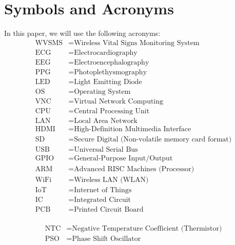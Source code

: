 
\chapter*{Symbols and  Acronyms}
  

\vspace{1cm}

In this paper, we  will  use the  following  acronyms:
\begin{align*}
\mbox{WVSMS} & =  \mbox{Wireless Vital Signs Monitoring System}    \\
\mbox{ECG} & =  \mbox{Electrocardiography}     \\
\mbox{EEG} & =  \mbox{Electroencephalography}     \\
\mbox{PPG} & =  \mbox{Photoplethysmography}    \\
\mbox{LED} & =  \mbox{Light Emitting Diode} \\
\mbox{OS} & =  \mbox{Operating System}	\\
\mbox{VNC} & =  \mbox{Virtual Network Computing}  \\
\mbox{CPU} & =  \mbox{Central Processing Unit}  \\
\mbox{LAN} & =  \mbox{Local Area Network}  \\
\mbox{HDMI} & =  \mbox{High-Definition Multimedia Interface}  \\
\mbox{SD} & =  \mbox{Secure Digital (Non-volatile memory card format)}  \\
\mbox{USB} & =  \mbox{Universal Serial Bus}  \\
\mbox{GPIO} & =  \mbox{General-Purpose Input/Output}  \\
\mbox{ARM} & =  \mbox{Advanced RISC Machines (Processor)}  \\
\mbox{WiFi} & =  \mbox{Wireless LAN (WLAN)}  \\
\mbox{IoT} & =  \mbox{Internet of Things}  \\
\mbox{IC} & =  \mbox{Integrated Circuit} \\
\mbox{PCB} & =  \mbox{Printed Circuit Board}  \\
\end{align*}


\begin{align*}
\mbox{NTC} & =  \mbox{Negative Temperature Coefficient (Thermistor)}  \\ 
\mbox{PSO} & =  \mbox{Phase Shift Oscillator}  
\end{align*}
